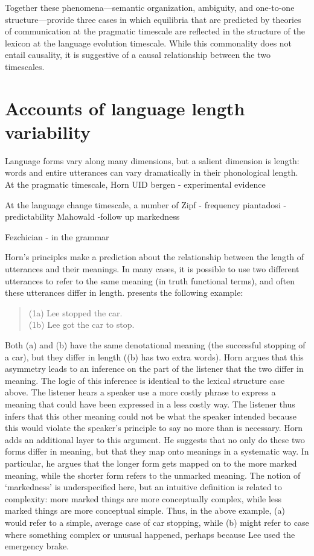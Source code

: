 \documentclass[man]{apa2}
\begin{document}
Together these phenomena---semantic organization, ambiguity, and one-to-one structure---provide three cases in which equilibria  that are predicted by theories of communication at the pragmatic timescale are reflected in the structure of the lexicon at the language evolution timescale. While this commonality does not entail causality, it is suggestive of a causal relationship between the two timescales.

\section{Accounts of language length variability}

Language forms vary along many dimensions, but a salient dimension is length: words and entire utterances can vary dramatically in their phonological length. At the pragmatic timescale, 
Horn
UID
bergen - experimental evidence

At the language change timescale, a number of 
Zipf - frequency
piantadosi - predictability
Mahowald -follow up
markedness
 
Fezchician - in the grammar






Horn's principles make a prediction about the relationship between the length of utterances and their meanings. In many cases, it is possible to use two different utterances to refer to the same meaning (in truth functional terms), and often these utterances differ in length.  presents the following example: 
\begin{quote} 
 	(1a) Lee stopped the car.\\
	(1b) Lee got the car to stop.
	
\end{quote}
Both (a) and (b) have the same denotational meaning (the successful stopping of a car), but they differ in length ((b) has two extra words). Horn argues that this asymmetry leads to an inference on the part of the listener that the two differ in meaning. The logic of this inference is  identical to the lexical structure case above. The listener hears a speaker use a more costly phrase to express a meaning that could have been expressed in a less costly way. The listener thus infers that this other meaning could not be what the speaker intended because this would violate the speaker's principle to say no more than is necessary. Horn adds an additional layer to this argument. He suggests that no only do these two forms differ in meaning, but that they map onto meanings in a systematic way. In particular, he argues that the longer form gets mapped on to the more marked meaning, while the shorter form refers to the unmarked meaning.  The notion of `markedness' is underspecified here, but an intuitive definition is related to complexity: more marked things are more conceptually complex, while less marked things are more conceptual simple.  Thus, in the above example, (a) would refer to a simple, average case of car stopping, while (b) might refer to case where something complex or unusual happened, perhaps because Lee used the emergency brake.
\end{document}
